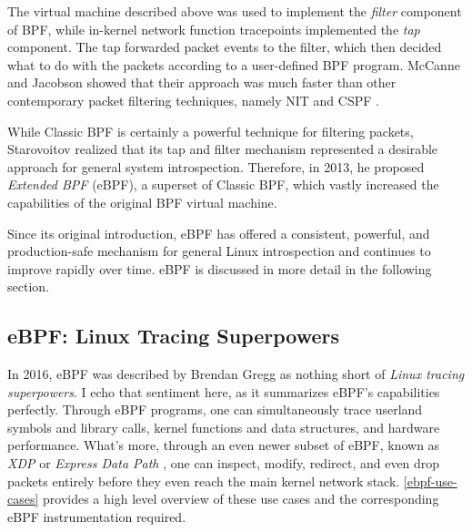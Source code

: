 \documentclass[
  12pt]{findlay}
\begin{document}
The virtual machine described above was used to implement the
\emph{filter} component of BPF, while in-kernel network function
tracepoints implemented the \emph{tap} component. The tap forwarded
packet events to the filter, which then decided what to do with the
packets according to a user-defined BPF program. McCanne and Jacobson
showed that their approach was much faster than other contemporary
packet filtering techniques, namely NIT \autocite{nit} and CSPF
\autocite{mogul87}.

While Classic BPF is certainly a powerful technique for filtering
packets, Starovoitov \autocite{starovoitov13,starovoitov14} realized
that its tap and filter mechanism represented a desirable approach for
general system introspection. Therefore, in 2013, he proposed
\emph{Extended BPF} (eBPF), a superset of Classic BPF, which vastly
increased the capabilities of the original BPF virtual machine.

Since its original introduction, eBPF has offered a consistent,
powerful, and production-safe mechanism for general Linux introspection
and continues to improve rapidly over time. eBPF is discussed in more
detail in the following section.

\hypertarget{ebpf-linux-tracing-superpowers}{%
\subsection{eBPF: Linux Tracing
Superpowers}\label{ebpf-linux-tracing-superpowers}}

\label{ebpf-superpowers}

In 2016, eBPF was described by Brendan Gregg \autocite{gregg16} as
nothing short of \emph{Linux tracing superpowers}. I echo that sentiment
here, as it summarizes eBPF's capabilities perfectly. Through eBPF
programs, one can simultaneously trace userland symbols and library
calls, kernel functions and data structures, and hardware performance.
What's more, through an even newer subset of eBPF, known as \emph{XDP}
or \emph{Express Data Path} \autocite{hoiland18}, one can inspect,
modify, redirect, and even drop packets entirely before they even reach
the main kernel network stack. \autoref{ebpf-use-cases} provides a high
level overview of these use cases and the corresponding eBPF
instrumentation required.
\end{document}
